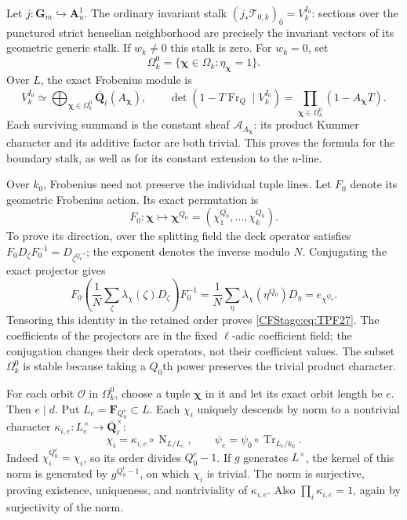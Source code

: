 Let \(j:\mathbf G_m\hookrightarrow\mathbf A^1_u\).
The ordinary invariant stalk
\((j_*\mathcal T_{0,k})_{\bar0}=V_k^{I_0}\):
sections over the punctured strict henselian
neighborhood are precisely the invariant vectors
of its geometric generic stalk. If \(w_k\ne0\)
this stalk is zero. For \(w_k=0\), set
\[
 \Omega_k^0=\{\boldsymbol\chi\in\Omega_k:
                         \eta_{\boldsymbol\chi}=1\}.
 \tag{TPF.25}\label{CFStage:eq:TPF25}
\]
Over \(L\), the exact Frobenius module is
\[
 V_k^{I_0}\simeq
       \bigoplus_{\boldsymbol\chi\in\Omega_k^0}
                    \overline{\mathbf Q}_\ell(A_{\boldsymbol\chi}),
 \qquad
 \det(1-T\operatorname{Fr}_Q\mid V_k^{I_0})
       =\prod_{\boldsymbol\chi\in\Omega_k^0}
                              (1-A_{\boldsymbol\chi}T).
 \tag{TPF.26}\label{CFStage:eq:TPF26}
\]
Each surviving summand is the constant sheaf
\(\mathcal A_{A_{\boldsymbol\chi}}\): its product
Kummer character and its additive factor are
both trivial. This proves the formula for the
boundary stalk, as well as for its constant
extension to the \(u\)-line.

Over \(k_0\), Frobenius need not preserve the
individual tuple lines. Let \(F_0\) denote its
geometric Frobenius action. Its exact permutation
is
\[
 F_0:\boldsymbol\chi\longmapsto
       \boldsymbol\chi^{Q_0}
              =(\chi_1^{Q_0},\ldots,\chi_k^{Q_0}).
 \tag{TPF.27}\label{CFStage:eq:TPF27}
\]
To prove its direction, over the splitting field
the deck operator satisfies
\(F_0D_\zeta F_0^{-1}=D_{\zeta^{Q_0^{-1}}}\);
the exponent denotes the inverse modulo \(N\).
Conjugating the exact projector gives
\[
 F_0\left(\frac1N\sum_\zeta
       \lambda_\chi(\zeta)D_\zeta\right)F_0^{-1}
  =\frac1N\sum_\eta
       \lambda_\chi(\eta^{Q_0})D_\eta
  =e_{\chi^{Q_0}} .
 \tag{TPF.28}\label{CFStage:eq:TPF28}
\]
Tensoring this identity in the retained order proves
\eqref{CFStage:eq:TPF27}. The coefficients of the projectors
are in the fixed \(\ell\)-adic coefficient field;
the conjugation changes their deck operators, not
their coefficient values. The subset \(\Omega_k^0\)
is stable because taking a \(Q_0\)th power preserves
the trivial product character.

For each orbit \(\mathcal O\) in \(\Omega_k^0\),
choose a tuple \(\boldsymbol\chi\) in it and let its
exact orbit length be \(e\). Then \(e\mid d\).
Put \(L_e=\mathbf F_{Q_0^e}\subset L\).
Each \(\chi_i\) uniquely descends by norm to a
nontrivial character
\(\kappa_{i,e}:L_e^\times\to
\overline{\mathbf Q}_\ell^\times\):
\[
 \chi_i=\kappa_{i,e}\circ\operatorname N_{L/L_e},
 \qquad
 \psi_e=\psi_0\circ\operatorname{Tr}_{L_e/k_0}.
 \tag{TPF.29}\label{CFStage:eq:TPF29}
\]
Indeed \(\chi_i^{Q_0^e}=\chi_i\), so its order
divides \(Q_0^e-1\). If \(g\) generates \(L^\times\),
the kernel of this norm is generated by
\(g^{Q_0^e-1}\), on which \(\chi_i\) is trivial.
The norm is surjective, proving existence,
uniqueness, and nontriviality of \(\kappa_{i,e}\).
Also \(\prod_i\kappa_{i,e}=1\), again by surjectivity
of the norm.

